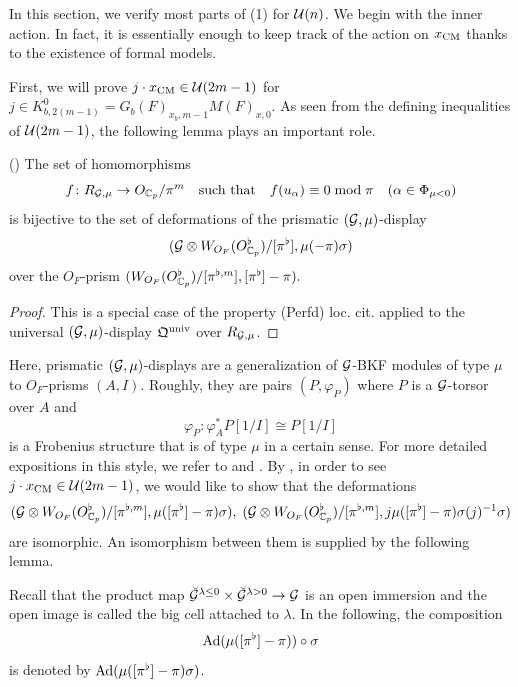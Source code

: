\documentclass[12pt,reqno]{amsart}
\begin{document}
In this section, we verify most parts of  (1) for ${\mathcal{U}}(n)$. We begin with the inner action. In fact, it is essentially enough to keep track of the action on $x_{\operatorname{CM}}$ thanks to the existence of formal models. 

First, we will prove $j \cdot x_{\operatorname{CM}} \in {\mathcal{U}}(2m - 1)$ for $j \in K^0_{b, 2(m-1)} = G_b(F)_{x_b, m-1} M(F)_{x, 0}$. As seen from the defining inequalities of ${\mathcal{U}}(2m - 1)$, the following lemma plays an important role. 

\begin{lem}\textup{(\cite[Definition 4.1.6, Theorem 4.1.8]{Ito25a})} \label{lem:Perfd_universal_deformation}
    The set of homomorphisms
    \[
        f\colon R_{{\mathcal{G}}, \mu} \to O_{\mathbb{C}_p} / \pi^m \quad \text{such that} \quad f(u_\alpha) \equiv 0 \bmod{\pi} \quad (\alpha \in \Phi_{\mu < 0})
    \]
    is bijective to the set of deformations of the prismatic $({\mathcal{G}}, \mu)$-display
    \[
        ({\mathcal{G}} \otimes W_{O_F}(O_{\mathbb{C}_p}^\flat)/[\pi^{\flat}], \mu(-\pi)\sigma)
    \]
    over the $O_F$-prism
    $
        (W_{O_F}(O_{\mathbb{C}_p}^\flat)/[\pi^{\flat, m}], [\pi^\flat] - \pi).
    $
\end{lem}
\begin{proof}
    This is a special case of the property (Perfd) loc. cit. applied to the universal $({\mathcal{G}}, \mu)$-display ${\mathfrak{Q}}^{\operatorname{univ}}$ over $R_{{\mathcal{G}}, \mu}$. 
\end{proof}

Here, prismatic $({\mathcal{G}}, \mu)$-displays are a generalization of ${\mathcal{G}}$-BKF modules of type $\mu$ to $O_F$-prisms $(A, I)$. Roughly, they are pairs $(P, \varphi_P)$ where $P$ is a ${\mathcal{G}}$-torsor over $A$ and
\[
    \varphi_P \colon \varphi_A^* P[1/I] \cong P[1/I]
\]
is a Frobenius structure that is of type $\mu$ in a certain sense. For more detailed expositions in this style, we refer to \cite[Section 1.5.2]{IKY23} and \cite[Section 2.2]{Tak25z}. By , in order to see $j \cdot x_{\operatorname{CM}} \in {\mathcal{U}}(2m - 1)$, we would like to show that the deformations
\[
    ({\mathcal{G}} \otimes W_{O_F}(O_{\mathbb{C}_p}^\flat)/[\pi^{\flat ,m}], \mu([\pi^\flat] - \pi) \sigma) ,\;
    ({\mathcal{G}} \otimes W_{O_F}(O_{\mathbb{C}_p}^\flat)/[\pi^{\flat ,m}], j \mu([\pi^\flat] - \pi) \sigma(j)^{-1} \sigma)
\]
are isomorphic. An isomorphism between them is supplied by the following lemma. 

Recall that the product map ${\mathcal{\breve{G}}}^{\lambda \leq 0} \times{\mathcal{\breve{G}}}^{\lambda > 0} \to {\mathcal{G}}$ is an open immersion and the open image is called the big cell attached to $\lambda$. In the following, the composition 
\[
    {\operatorname{Ad}}(\mu([\pi^\flat] - \pi)) \circ \sigma
\]
is denoted by ${\operatorname{Ad}}(\mu([\pi^\flat] - \pi) \sigma)$. 
\end{document}
